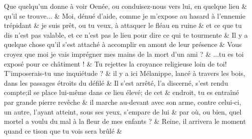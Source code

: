 \documentclass[12pt,onecolumn,twoside,a4paper]{memoir}
\begin{document}
\begin{pairs}
\begin{Rightside}
                       
                         \stanza  Que quelqu’un donne à voir Oenée, ou conduisez-nous vers lui, en
                              quelque lieu  & 
                     qu’il se trouve...  \&
                         \stanza 
                      Moi, dénué d’aide, comme je m’expose au hasard à l’ennemie trépidant
                            \&
                         \stanza 
                      je suis prêt, ou tu veux, à attaquer le fléau en ruine \&
                         \stanza 
                      et ce que tu dis n’est pas valable, et ce n’est pas le lieu pour dire
                              ce qui te tourmente \&
                         \stanza 
                      Il y a quelque chose qu’il s’est attaché à accomplir en amont de leur
                              présence \&
                         \stanza 
                      Vous croyez que moi je vais imprégner mes mains de la mort d’un ami ?
                            \&
                         \stanza 
                      ...tu es toi exposé pour ce châtiment ! \&
                         \stanza 
                      Tu rejettes la croyance religieuse loin de toi! T’imposerais-tu une
                              inquiétude ?  \&
                         \stanza 
                      il y a ici Mélanippe, lancé à travers les bois, dans les passages
                              étroits du défilé \&
                         \stanza  Il s’est arrêté, l’a discerné, s’est rendu compte;il se place
                              lui-même dans ce lieu élevé; de cet  & 
                     endroit, tu es entraîné par grande pierre revêche \&
                         \stanza 
                      il marche au-devant avec son arme, contre celui-ci, un autre, l’ayant
                              atteint, sous ses yeux, s’empare de lui \&
                         \stanza 
                      par où, ou bien, quel mortel a voulu du mal à la fleur de mes enfants
                              ?  \&
                         \stanza 
                      Reine, il arrivera le moment quand ce tison que tu vois sera brûlé
                            \&
                     
                  \endnumbering
		\end{Rightside}
               \end{pairs}
	\Columns
            
            
\end{document}
